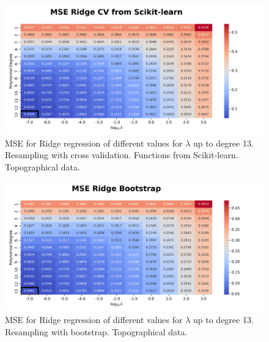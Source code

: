 \documentclass{article}
\begin{document}
\begin{figure}[htbp]
    \centering
    \includegraphics[width=\textwidth]{Project1/figures/Terrain/Heatmap_MSE_Ridge_CV_from_Scikit-learn.png}
    \caption{MSE for Ridge regression of different values for $\lambda$ up to degree 13. Resampling with cross validation. Functions from Scikit-learn. Topographical data.}
    \label{fig:TerrainRidgeCVsklearn}
\end{figure}

\begin{figure}[htbp]
    \centering
    \includegraphics[width=\textwidth]{Project1/figures/Terrain/Heatmap_MSE_Ridge_Bootstrap.png}
    \caption{MSE for Ridge regression of different values for $\lambda$ up to degree 13. Resampling with bootstrap. Topographical data.}
    \label{fig:TerrainRidgeBootstrap}
\end{figure}

\newpage
\end{document}
